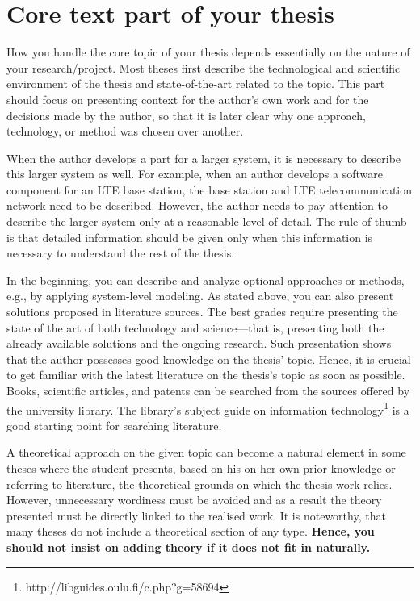 \section{Core text part of your thesis}
\label{sec:core_text}

How you handle the core topic of your thesis depends essentially on the nature of your research/project. Most theses first describe the technological and scientific environment of the thesis and state-of-the-art related to the topic. This part should focus on presenting context for the author’s own work and for the decisions made by the author, so that it is later clear why one approach, technology, or method was chosen over another.

When the author develops a part for a larger system, it is necessary to describe this larger system as well. For example, when an author develops a software component for an LTE base station, the base station and LTE telecommunication network need to be described. However, the author needs to pay attention to describe the larger system only at a reasonable level of detail. The rule of thumb is that detailed information should be given only when this information is necessary to understand the rest of the thesis.

In the beginning, you can describe and analyze optional approaches or methods, e.g., by applying system-level modeling. As stated above, you can also present solutions proposed in literature sources. The best grades require presenting the state of the art of both technology and science---that is, presenting both the already available solutions and the ongoing research. Such presentation shows that the author possesses good knowledge on the thesis’ topic. Hence, it is crucial to get familiar with the latest literature on the thesis’s topic as soon as possible. Books, scientific articles, and patents can be searched from the sources offered by the university library. The library’s subject guide on information technology\footnote{ http://libguides.oulu.fi/c.php?g=58694} is a good starting point for searching literature.

A theoretical approach on the given topic can become a natural element in some theses where the student presents, based on his on her own prior knowledge or referring to literature, the theoretical grounds on which the
thesis work relies. However, unnecessary wordiness must be avoided and as a result the theory presented must be directly linked to the realised work. It is noteworthy, that many theses do not include a theoretical section of any type. \textbf{Hence, you should not insist on adding theory if it does not fit in naturally.}


